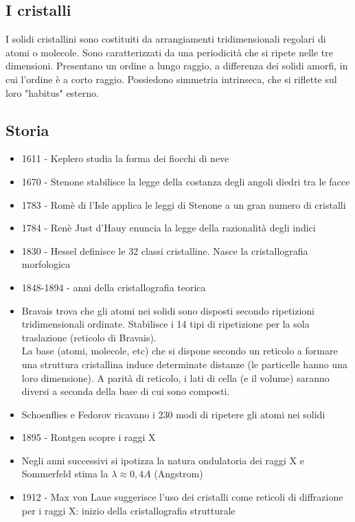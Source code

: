 \documentclass{article}
\begin{document}
\subsection{I cristalli}
I solidi cristallini sono costituiti da arrangiamenti tridimensionali regolari di atomi o molecole. Sono caratterizzati da una periodicità che si ripete nelle tre dimensioni. Presentano un ordine a lungo raggio, a differenza dei solidi amorfi, in cui l'ordine è a corto raggio. Possiedono simmetria intrinseca, che si riflette sul loro "habitus" esterno.

\subsection{Storia}
\begin{itemize}
    \item 1611 - Keplero studia la forma dei fiocchi di neve
    \item 1670 - Stenone stabilisce la legge della costanza degli angoli diedri tra le facce
    \item 1783 - Romè di l'Isle applica le leggi di Stenone a un gran numero di cristalli
    \item 1784 - Renè Just d'Hauy enuncia la legge della razionalità degli indici
    \item 1830 - Hessel definisce le 32 classi cristalline. Nasce la cristallografia morfologica
    \item 1848-1894 - anni della cristallografia teorica
    \item Bravais trova che gli atomi nei solidi sono disposti secondo ripetizioni tridimensionali ordinate. Stabilisce i 14 tipi di ripetizione per la sola traslazione (reticolo di Bravais).\\
    La base (atomi, molecole, etc) che si dispone secondo un reticolo a formare una struttura cristallina induce determinate distanze (le particelle hanno una loro dimensione). A parità di reticolo, i lati di cella (e il volume) saranno diversi a seconda della base di cui sono composti.
    \item Schoenflies e Fedorov ricavano i 230 modi di ripetere gli atomi nei solidi
    \item 1895 - Rontgen scopre i raggi X
    \item Negli anni successivi si ipotizza la natura ondulatoria dei raggi X e Sommerfeld stima la $\lambda\approx0,4 A$ (Angstrom)
    \item 1912 - Max von Laue suggerisce l'uso dei cristalli come reticoli di diffrazione per i raggi X: inizio della cristallografia strutturale

\end{itemize}
\end{document}
